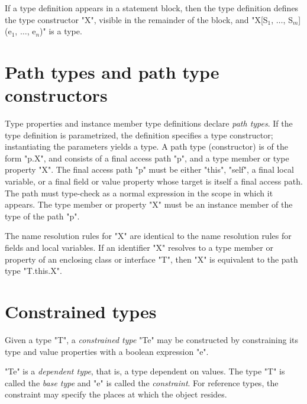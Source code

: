        If a type definition 
        appears in a statement block, then
        the type definition
        defines the type constructor \xcd"X", visible in the
        remainder of the block,
and
\xcdmath"X[S$_1$, $\dots$, S$_m$](e$_1$, $\dots$, e$_n$)"
is a type.

\section{Path types and path type constructors}


Type properties and instance member type definitions 
declare \emph{path types}.
If the type definition is parametrized, the definition specifies
a type constructor; instantiating the parameters yields a type.
A path type (constructor)
is of the form \xcd"p.X", and consists of a final access path
\xcd"p", and a type
member or type property \xcd"X".
The final access path \xcd"p" must be either \xcd"this", \xcd"self", a final
local variable, or a final field or value property whose target
is itself a final access path.  The path must type-check 
as a normal expression in the scope in which it appears.
The type member or property
\xcd"X" must be an instance member of the type of the
path \xcd"p".

The name resolution rules for \xcd"X" are identical to the name
resolution rules for fields and local variables.
If an identifier \xcd"X" resolves to a type member or property
of an enclosing class or interface \xcd"T", then \xcd"X" is equivalent to
the path type \xcd"T.this.X".

\section{Constrained types}
\label{ConstrainedTypes}
\label{DepType:DepType}
\label{DepTypes}


        Given a type \xcd"T", a {\em constrained type}
        \xcd"T{e}" may be
        constructed by constraining its type and value properties with a
        boolean expression \xcd"e".

        \xcd"T{e}" is a {\em dependent type}, that is, a type
        dependent on values.
        The type \xcd"T" is called the
        {\em base type} and \xcd"e" is called the {\em constraint}.
        For reference types, the constraint may
        specify the places at which the object resides.

